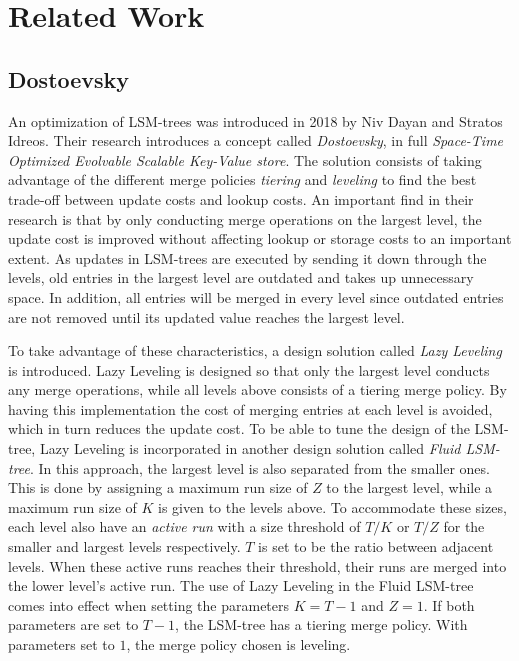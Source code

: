 \chapter{Related Work}

\section{Dostoevsky}
\label{Dostoevsky}
An optimization of LSM-trees was introduced in 2018 by Niv Dayan and Stratos Idreos. Their research introduces a concept called \emph{Dostoevsky}, in full \emph{Space-Time Optimized Evolvable Scalable Key-Value store}\cite{Dostoevsky}. The solution consists of taking advantage of the different merge policies \emph{tiering} and \emph{leveling} to find the best trade-off between update costs and lookup costs. An important find in their research is that by only conducting merge operations on the largest level, the update cost is improved without affecting lookup or storage costs to an important extent. As updates in LSM-trees are executed by sending it down through the levels, old entries in the largest level are outdated and takes up unnecessary space. In addition, all entries will be merged in every level since outdated entries are not removed until its updated value reaches the largest level.\newline 

To take advantage of these characteristics, a design solution called \emph{Lazy Leveling} is introduced. Lazy Leveling is designed so that only the largest level conducts any merge operations, while all levels above consists of a tiering merge policy. By having this implementation the cost of merging entries at each level is avoided, which in turn reduces the update cost. To be able to tune the design of the LSM-tree, Lazy Leveling is incorporated in another design solution called \emph{Fluid LSM-tree}. In this approach, the largest level is also separated from the smaller ones. This is done by assigning a maximum run size of $Z$ to the largest level, while a maximum run size of $K$ is given to the levels above. To accommodate these sizes, each level also have an \emph{active run} with a size threshold of $T/K$ or $T/Z$ for the smaller and largest levels respectively. $T$ is set to be the ratio between adjacent levels. When these active runs reaches their threshold, their runs are merged into the lower level's active run. The use of Lazy Leveling in the Fluid LSM-tree comes into effect when setting the parameters $K=T-1$ and $Z = 1$. If both parameters are set to $T-1$, the LSM-tree has a tiering merge policy. With parameters set to $1$, the merge policy chosen is leveling. \newline

